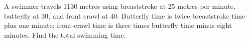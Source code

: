 A swimmer travels 1130 metres using breaststroke at 25 metres per minute, butterfly at 30, and front crawl at 40. Butterfly time is twice breaststroke time plus one minute; front-crawl time is three times butterfly time minus eight minutes. Find the total swimming time.
